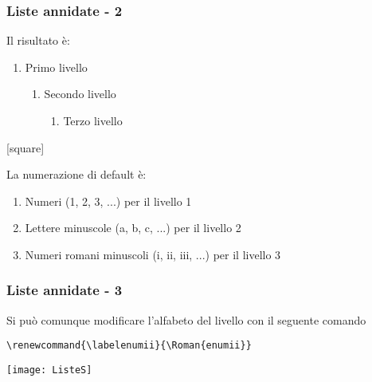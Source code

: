 \begin{frame}[fragile]
 \frametitle{Liste annidate - 2}
 Il risultato è:
\begin{enumerate}
   \item Primo livello
   \begin{enumerate}
     \item Secondo livello
     \begin{enumerate}
       \item Terzo livello
     \end{enumerate}
   \end{enumerate}
 \end{enumerate}
\vspace{5mm}

[square]

La numerazione di default è:
\begin{enumerate}
    \item Numeri (1, 2, 3, ...) per il livello 1
    \item Lettere minuscole (a, b, c, ...) per il livello 2
    \item Numeri romani minuscoli (i, ii, iii, ...) per il livello 3
\end{enumerate}
\end{frame}
\begin{frame}[fragile]
 \frametitle{Liste annidate - 3}
Si può comunque modificare l'alfabeto del livello con il seguente comando
\begin{code}
\begin{verbatim}
\renewcommand{\labelenumii}{\Roman{enumii}}
\end{verbatim}
\end{code}

\vspace{5mm}

\centering
\texttt{[image: ListeS]}

\end{frame}


